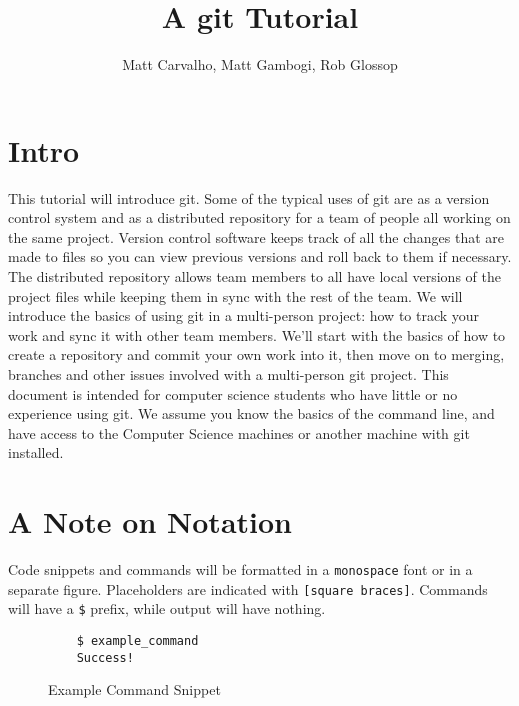 \documentclass[11pt]{report}
\title{A git Tutorial}
\author{Matt Carvalho, Matt Gambogi, Rob Glossop}
\begin{document}
\thispagestyle{empty}
\maketitle

\clearpage {} 

\tableofcontents

\listoffigures

\clearpage {}
\section{Intro}
This tutorial will introduce git. Some of the typical uses of git are
as a version control system and as a distributed repository for a team
of people all working on the same project. Version control software
keeps track of all the changes that are made to files so you can view
previous versions and roll back to them if necessary.  The distributed
repository allows team members to all have local versions of the
project files while keeping them in sync with the rest of the team. We
will introduce the basics of using git in a multi-person project: how
to track your work and sync it with other team members. We'll start
with the basics of how to create a repository and commit your own work
into it, then move on to merging, branches and other issues involved
with a multi-person git project. This document is intended for
computer science students who have little or no experience using
git. We assume you know the basics of the command line, and have
access to the Computer Science machines or another machine with git
installed.

\section{A Note on Notation}
Code snippets and commands will be formatted in a \texttt{monospace} font or in
a separate figure. Placeholders are indicated with \texttt{[square
    braces]}. Commands will have a \texttt{\$} prefix, while output
will have nothing.
\begin{figure}[h]
  \caption{Example Command Snippet}
  \begin{lstlisting}
    $ example_command
    Success!
  \end{lstlisting}
\end{figure}
\end{document}
